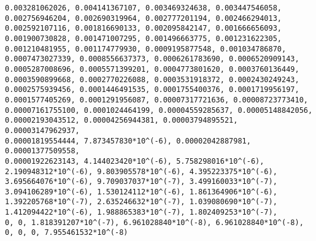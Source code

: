 \documentclass[12pt]{article}
\begin{document}
\begin{verbatim}
0.003281062026, 0.004141367107, 0.003469324638, 0.003447546058, 
0.002756946204, 0.002690319964, 0.002777201194, 0.002466294013, 
0.002592107116, 0.001816690133, 0.002095842147, 0.001666656093, 
0.001900730828, 0.001471007295, 0.001496663775, 0.001231622305, 
0.001210481955, 0.001174779930, 0.0009195877548, 0.001034786870, 
0.0007473027339, 0.0008556637373, 0.0006261783690, 0.0006520909143, 
0.0005287008696, 0.0005571399201, 0.0004773801620, 0.0003760136449, 
0.0003590899668, 0.0002770226088, 0.0003531918372, 0.0002430249243, 
0.0002575939456, 0.0001446491535, 0.0001755400376, 0.0001719956197, 
0.0001577405269, 0.0001291956087, 0.00007317721636, 0.00008723773410, 
0.00007161755100, 0.0001024464199, 0.00004559285637, 0.00005148842056, 
0.00002193043512, 0.00004256944381, 0.00003794895521, 0.00003147962937, 
0.00001819554444, 7.873457830*10^(-6), 0.00002042887981, 0.00001377509558, 
0.00001922623143, 4.144023420*10^(-6), 5.758298016*10^(-6), 
2.190948312*10^(-6), 9.803905578*10^(-6), 4.395223375*10^(-6), 
3.695664076*10^(-6), 9.709037037*10^(-7), 3.499160033*10^(-7), 
3.094106289*10^(-6), 1.530124112*10^(-6), 1.861364906*10^(-6), 
1.392205768*10^(-7), 2.635246632*10^(-7), 1.039080690*10^(-7), 
1.412094422*10^(-6), 1.988865383*10^(-7), 1.802409253*10^(-7), 
0, 0, 1.818391207*10^(-7), 6.961028840*10^(-8), 6.961028840*10^(-8), 
0, 0, 0, 7.955461532*10^(-8)
\end{verbatim}
\end{document}
